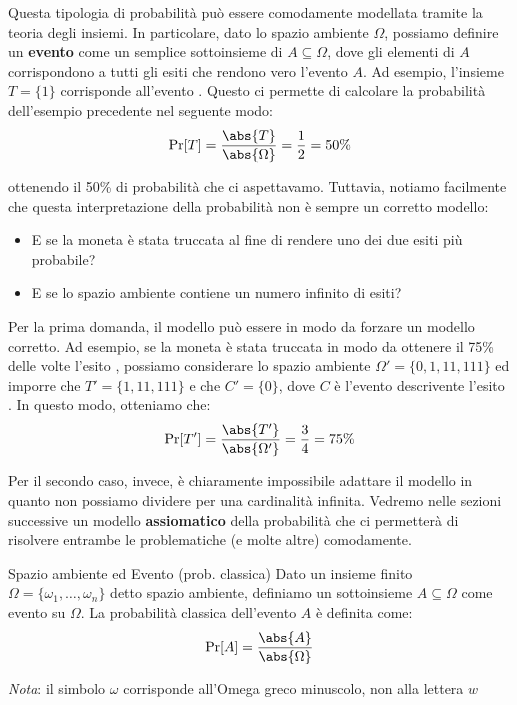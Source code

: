 \documentclass[a4paper, 12pt]{report}
\begin{document}
    Questa tipologia di probabilità può essere comodamente modellata tramite la teoria degli insiemi. In particolare, dato lo spazio ambiente $\Omega$, possiamo definire un \textbf{evento} come un semplice sottoinsieme di $A \subseteq \Omega$, dove gli elementi di $A$ corrispondono a tutti gli esiti che rendono vero l'evento $A$. Ad esempio, l'insieme $T = \{1\}$ corrisponde all'evento . Questo ci permette di calcolare la probabilità dell'esempio precedente nel seguente modo:
    \[\Pr[T] = \frac{\abs{T}}{\abs{\Omega}} = \frac{1}{2} = 50\%\]

    ottenendo il 50\% di probabilità che ci aspettavamo. Tuttavia, notiamo facilmente che questa interpretazione della probabilità non è sempre un corretto modello:
    \begin{itemize}
        \item E se la moneta è stata truccata al fine di rendere uno dei due esiti più probabile?
        \item E se lo spazio ambiente contiene un numero infinito di esiti?
    \end{itemize}

    Per la prima domanda, il modello può essere  in modo da forzare un modello corretto. Ad esempio, se la moneta è stata truccata in modo da ottenere il 75\% delle volte l'esito , possiamo considerare lo spazio ambiente $\Omega' = \{0,1,11,111\}$ ed imporre che $T' = \{1,11,111\}$ e che $C' = \{0\}$, dove $C$ è l'evento descrivente l'esito . In questo modo, otteniamo che:
    \[\Pr[T'] = \frac{\abs{T'}}{\abs{\Omega'}} = \frac{3}{4} = 75\%\]

    Per il secondo caso, invece, è chiaramente impossibile adattare il modello in quanto non possiamo dividere per una cardinalità infinita. Vedremo nelle sezioni successive un modello \textbf{assiomatico} della probabilità che ci permetterà di risolvere entrambe le problematiche (e molte altre) comodamente.

    \begin{frameddefn}{Spazio ambiente ed Evento (prob. classica)}
        Dato un insieme finito $\Omega = \{\omega_1, \ldots, \omega_n\}$ detto spazio ambiente, definiamo un sottoinsieme $A \subseteq \Omega$ come evento su $\Omega$. 
        La probabilità classica dell'evento $A$ è definita come:
        \[\Pr[A] = \frac{\abs{A}}{\abs{\Omega}}\]

        \textit{Nota}: il simbolo $\omega$ corrisponde all'Omega greco minuscolo, non alla lettera $w$
    \end{frameddefn}
\end{document}
